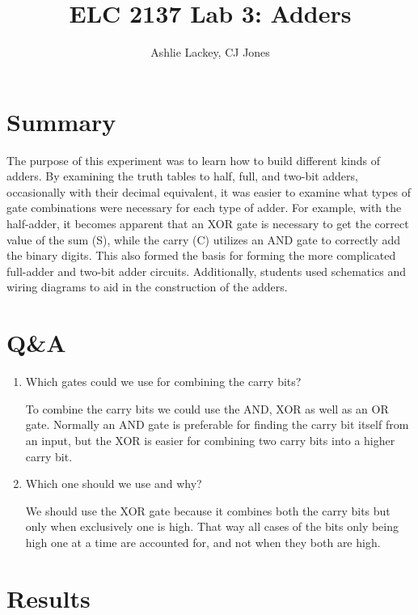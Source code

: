 \documentclass[11pt]{article}
\begin{document}
\title{ELC 2137 Lab 3: Adders }
\author{Ashlie Lackey, CJ Jones}

\maketitle


\section*{Summary}

The purpose of this experiment was to learn how to build different kinds of adders. By examining the truth tables to half, full, and two-bit adders, occasionally with their decimal equivalent, it was easier to examine what types of gate combinations were necessary for each type of adder. For example, with the half-adder, it becomes apparent that an XOR gate is necessary to get the correct value of the sum (S), while the carry (C) utilizes an AND gate to correctly add the binary digits. This also formed the basis for forming the more complicated full-adder and two-bit adder circuits. Additionally, students used schematics and wiring diagrams to aid in the construction of the adders.


\section*{Q\&A}

\begin{enumerate}
	\item Which gates could we use for combining the carry bits?
	
	To combine the carry bits we could use the AND, XOR as well as an OR gate. Normally an AND gate is preferable for finding the carry bit itself from an input, but the XOR is easier for combining two carry bits into a higher carry bit. 
	
	\item Which one should we use and why?
	
	We should use the XOR gate because it combines both the carry bits but only when exclusively one is high. That way all cases of the bits only being high one at a time are accounted for, and not when they both are high. 
\end{enumerate}




\section*{Results}
\end{document}
